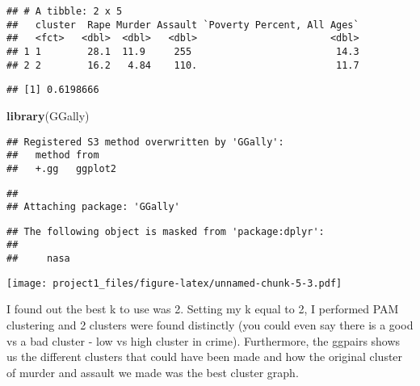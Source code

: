 \documentclass[]{article}
\newenvironment{Shaded}{\begin{snugshade}}{\end{snugshade}}
\newcommand{\DataTypeTok}[1]{\textcolor[rgb]{0.13,0.29,0.53}{#1}}
\newcommand{\DecValTok}[1]{\textcolor[rgb]{0.00,0.00,0.81}{#1}}
\newcommand{\KeywordTok}[1]{\textcolor[rgb]{0.13,0.29,0.53}{\textbf{#1}}}
\newcommand{\NormalTok}[1]{#1}
\newcommand{\OperatorTok}[1]{\textcolor[rgb]{0.81,0.36,0.00}{\textbf{#1}}}
\begin{document}
\begin{verbatim}
## # A tibble: 2 x 5
##   cluster  Rape Murder Assault `Poverty Percent, All Ages`
##   <fct>   <dbl>  <dbl>   <dbl>                       <dbl>
## 1 1        28.1  11.9     255                         14.3
## 2 2        16.2   4.84    110.                        11.7
\end{verbatim}

\begin{Shaded}
\end{Shaded}

\begin{verbatim}
## [1] 0.6198666
\end{verbatim}

\begin{Shaded}
\begin{Highlighting}[]
\KeywordTok{library}\NormalTok{(GGally)}
\end{Highlighting}
\end{Shaded}

\begin{verbatim}
## Registered S3 method overwritten by 'GGally':
##   method from   
##   +.gg   ggplot2
\end{verbatim}

\begin{verbatim}
## 
## Attaching package: 'GGally'
\end{verbatim}

\begin{verbatim}
## The following object is masked from 'package:dplyr':
## 
##     nasa
\end{verbatim}

\begin{Shaded}
\end{Shaded}

\texttt{[image: project1\_files/figure-latex/unnamed-chunk-5-3.pdf]}

I found out the best k to use was 2. Setting my k equal to 2, I
performed PAM clustering and 2 clusters were found distinctly (you could
even say there is a good vs a bad cluster - low vs high cluster in
crime). Furthermore, the ggpairs shows us the different clusters that
could have been made and how the original cluster of murder and assault
we made was the best cluster graph.
\end{document}
